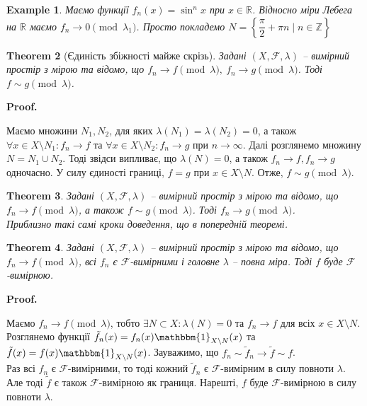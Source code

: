 \documentclass[a4paper, 10pt]{article}
\makeatletter
\theoremstyle{theoremdd}
\newtheorem{theorem}{Theorem}[subsection]
\newtheorem{example}[theorem]{Example}
\renewenvironment{proof}[1][Proof.\\]{\par
\pushQED{\hfill \qed}%
\normalfont \topsep6\p@\@plus6\p@\relax
\trivlist
\item\relax
{\bfseries
#1\@addpunct{.}}\hspace\labelsep\ignorespaces
}{%
\popQED\endtrivlist\@endpefalse
}
\makeatother
\begin{document}
\begin{example}
Маємо функції $f_n(x) = \sin^n x$ при $x \in \mathbb{R}$. Відносно міри Лебега на $\mathbb{R}$ маємо $f_n \to 0 \pmod{\lambda_1}$. Просто покладемо $N = \left\{ \dfrac{\pi}{2} + \pi n \mid n \in \mathbb{Z} \right\}$
\end{example}

\begin{theorem}[Єдиність збіжності майже скрізь]
Задані $(X,\mathcal{F},\lambda)$ -- вимірний простір з мірою та відомо, що $f_n \to f \pmod \lambda,\ f_n \to g \pmod \lambda$. Тоді $f \sim g \pmod \lambda$.
\end{theorem}

\begin{proof}
Маємо множини $N_1,N_2$, для яких $\lambda(N_1) = \lambda(N_2) = 0$, а також $\forall x \in X \setminus N_1: f_n \to f$ та $\forall x \in X \setminus N_2: f_n \to g$ при $n \to \infty$. Далі розглянемо множину $N = N_1 \cup N_2$. Тоді звідси випливає, що $\lambda(N) = 0$, а також $f_n \to f, f_n \to g$ одночасно. У силу єдиності границі, $f = g$ при $x \in X \setminus N$. Отже, $f \sim g \pmod \lambda$. 
\end{proof}

\begin{theorem}
Задані $(X,\mathcal{F},\lambda)$ -- вимірний простір з мірою та відомо, що $f_n \to f \pmod \lambda$, а також $f \sim g \pmod \lambda$. Тоді $f_n \to g \pmod \lambda$.\\
\textit{Приблизно такі самі кроки доведення, що в попередній теоремі.}
\end{theorem}

\begin{theorem}
Задані $(X,\mathcal{F},\lambda)$ -- вимірний простір з мірою та відомо, що $f_n \to f \pmod \lambda$, всі $f_n$ є $\mathcal{F}$-вимірними і головне $\lambda$ -- повна міра. Тоді $f$ буде $\mathcal{F}$-вимірною.
\end{theorem}

\begin{proof}
Маємо $f_n \to f \pmod \lambda$, тобто $\exists N \subset X: \lambda(N) = 0$ та $f_n \to f$ для всіх $x \in X \setminus N$.\\
Розглянемо функції $\tilde{f}_n(x) = f_n(x) \mathbbm{1}_{X \setminus N}(x)$ та $\tilde{f}(x) = f(x) \mathbbm{1}_{X \setminus N}(x)$. Зауважимо, що $f_n \sim \tilde{f}_n \to \tilde{f} \sim f$.\\
Раз всі $f_n$ є $\mathcal{F}$-вимірними, то тоді кожний $\tilde{f}_n$ є $\mathcal{F}$-вимірним в силу повноти $\lambda$. Але тоді $\tilde{f}$ є також $\mathcal{F}$-вимірною як границя. Нарешті, $f$ буде $\mathcal{F}$-вимірною в силу повноти $\lambda$.
\end{proof}
\end{document}
